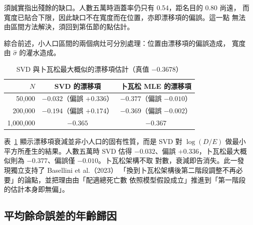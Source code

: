 \documentclass[UTF8, fontset=macnew, a4paper, 12pt]{ctexart}
\begin{document}
須誠實指出殘餘的缺口。人數五萬時涵蓋率仍只有 0.54，距名目的 0.80 尚遠，
而寬度已貼合下限，因此缺口不在寬度而在位置，亦即漂移項的偏誤。這一點
無法由區間方法解決，須回到第伍節的點估計。

綜合前述，小人口區間的兩個病灶可分別處理：位置由漂移項的偏誤造成，
寬度由 $\hat\sigma$ 的灌水造成。

\begin{table}[H]
\centering
\caption{SVD 與卜瓦松最大概似的漂移項估計（真值 $-0.3678$）}
\small
\begin{tabular}{rcc}
\toprule
$N$ & SVD 的漂移項 & 卜瓦松 MLE 的漂移項\\
\midrule
50,000    & $-0.032$（偏誤 $+0.336$） & $\mathbf{-0.377}$（偏誤 $-0.010$）\\
200,000   & $-0.194$（偏誤 $+0.174$） & $\mathbf{-0.369}$（偏誤 $-0.002$）\\
1,000,000 & $-0.365$ & $-0.367$\\
\bottomrule
\end{tabular}
\label{tab:drift}
\end{table}

表~\ref{tab:drift} 顯示漂移項衰減並非小人口的固有性質，而是 SVD 對
$\log(D/E)$ 做最小平方所產生的結果。人數五萬時 SVD 估得 $-0.032$、偏誤
$+0.336$，卜瓦松最大概似則為 $-0.377$、偏誤僅 $-0.010$。卜瓦松架構不取
對數，衰減即告消失。此一發現獨立支持了 Basellini et al.（2023）
「換到卜瓦松架構後第二階段調整不再必要」的論點，並把理由由「配適總死亡數
依照模型假設成立」推進到「第一階段的估計本身即無偏」。

\subsection{平均餘命誤差的年齡歸因}
\end{document}

